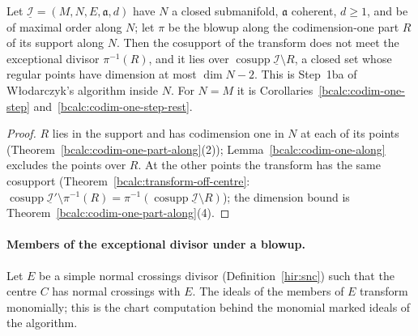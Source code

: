 \begin{corollary}
\label{bcalc:codim-one-step-along}
\upstreamleanok
Let \(\underline{\mathcal I}=(M,N,E,\mathfrak a,d)\) have \(N\) a closed submanifold, \(\mathfrak a\) coherent, \(d\ge1\), and be of maximal order along \(N\); let \(\pi\) be the
blowup along the codimension-one part \(R\) of its support along \(N\). Then the cosupport of the transform does not meet the exceptional divisor
\(\pi^{-1}(R)\), and it lies over \(\operatorname{cosupp}\underline{\mathcal I}\setminus R\), a closed set whose regular points have dimension at most \(\dim N-2\). This is
Step~1ba of Włodarczyk's algorithm inside \(N\). For \(N=M\) it is Corollaries~\ref{bcalc:codim-one-step} and~\ref{bcalc:codim-one-step-rest}.
\end{corollary}
\begin{proof}
\upstreamleanok
\(R\) lies in the support and has codimension one in \(N\) at each of its points (Theorem~\ref{bcalc:codim-one-part-along}(2)); Lemma~\ref{bcalc:codim-one-along} excludes the
points over \(R\). At the other points the transform has the same cosupport (Theorem~\ref{bcalc:transform-off-centre}:
\(\operatorname{cosupp}\underline{\mathcal I}'\setminus\pi^{-1}(R)=\pi^{-1}(\operatorname{cosupp}\underline{\mathcal I}\setminus R)\)); the dimension bound is
Theorem~\ref{bcalc:codim-one-part-along}(4).
\end{proof}

\paragraph{Members of the exceptional divisor under a blowup.} Let \(E\) be a simple normal crossings divisor (Definition~\ref{hir:snc}) such that
the centre \(C\) has normal crossings with \(E\). The ideals of the members of \(E\) transform monomially; this is the chart computation behind the
monomial marked ideals of the algorithm.

